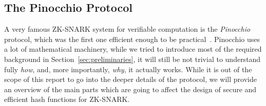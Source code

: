 \subsection{The Pinocchio Protocol}
A very famous ZK-SNARK system for verifiable computation is the \emph{Pinocchio} protocol,
which was the first one efficient enough to be practical~\cite{ParnoGHR2013}.
Pinocchio uses a lot of mathematical machinery, while we tried to introduce most of the required
background in Section~\ref{sec:preliminaries}, it will still be not trivial to understand fully
\emph{how}, and, more importantly, \emph{why}, it actually works.
While it is out of the scope of this report to go into the deeper details of the protocol, we will 
provide an overview of the main parts which are going to affect the design of secure and efficient 
hash functions for ZK-SNARK.

